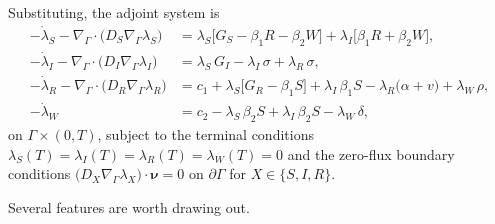 \documentclass[11pt]{article}
\newcommand{\Grad}{\nabla_\Gamma}
\newcommand{\Div}{\nabla_\Gamma\cdot}
\begin{document}
Substituting, the adjoint system is
\begin{align}
-\dot\lambda_S - \Div\big(D_S\Grad\lambda_S\big) &= \lambda_S\big[G_S - \beta_1 R - \beta_2 W\big] + \lambda_I\big[\beta_1 R + \beta_2 W\big], \label{eq:adjS}\\
-\dot\lambda_I - \Div\big(D_I\Grad\lambda_I\big) &= \lambda_S\,G_I - \lambda_I\,\sigma + \lambda_R\,\sigma, \label{eq:adjI}\\
-\dot\lambda_R - \Div\big(D_R\Grad\lambda_R\big) &= c_1 + \lambda_S\big[G_R - \beta_1 S\big] + \lambda_I\,\beta_1 S - \lambda_R\big(\alpha + v\big) + \lambda_W\,\rho, \label{eq:adjR}\\
-\dot\lambda_W &= c_2 - \lambda_S\,\beta_2 S + \lambda_I\,\beta_2 S - \lambda_W\,\delta, \label{eq:adjW}
\end{align}
on $\Gamma\times(0,T)$, subject to the terminal conditions $\lambda_S(T)=\lambda_I(T)=\lambda_R(T)=\lambda_W(T)=0$ and the zero-flux boundary conditions $\big(D_X\Grad\lambda_X\big)\cdot\boldsymbol\nu=0$ on $\partial\Gamma$ for $X\in\{S,I,R\}$.

Several features are worth drawing out.
\end{document}

